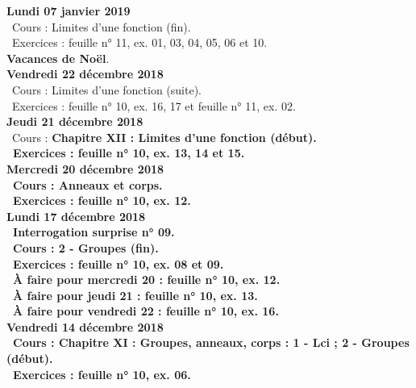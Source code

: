 \documentclass[12pt,a4paper]{article}
\begin{document}
\noindent\textbf{Lundi 07 janvier 2019} \\
\bu\ Cours : Limites d'une fonction (fin).\\
\bu\ Exercices : feuille n° 11, ex. 01, 03, 04, 05, 06 et 10.\vspace{.4cm}\\

\noindent\textbf{\bf Vacances de Noël}.\vspace{.4cm}\\

\noindent\textbf{Vendredi 22 décembre 2018}\\ 
\bu\ Cours : Limites d'une fonction (suite).\\
\bu\ Exercices : feuille n° 10, ex. 16, 17 et feuille n° 11, ex. 02.\vspace{.4cm}\\
 
\noindent\textbf{Jeudi 21 décembre 2018}\\
\bu\ Cours : \bf Chapitre XII \rm : Limites d'une fonction (début).\\
\bu\ Exercices : feuille n° 10, ex. 13, 14 et 15.\vspace{.4cm}\\
 
\noindent\textbf{\bf Mercredi 20 décembre 2018}\\
\bu\ Cours : Anneaux et corps.\\ 
\bu\ Exercices : feuille n° 10, ex. 12.\vspace{.4cm}\\
 
\noindent\textbf{Lundi 17 décembre 2018}\\
\bu\ Interrogation surprise n° 09.\\
\bu\ Cours : 2 - Groupes (fin).\\ 
\bu\ Exercices : feuille n° 10, ex. 08 et 09.\\
\bu\ À faire pour mercredi 20 : feuille n° 10, ex. 12.\\
\bu\ À faire pour jeudi 21 : feuille n° 10, ex. 13.\\
\bu\ À faire pour vendredi 22 : feuille n° 10, ex. 16.\vspace{.4cm}\\ 

\noindent\textbf{Vendredi 14 décembre 2018}\\
\bu\ Cours : \bf Chapitre XI \rm : Groupes, anneaux, corps  : 1 - Lci ; 2 - Groupes (début).\\ 
\bu\ Exercices : feuille n° 10, ex. 06.\vspace{.4cm}\\
 
\end{document}
